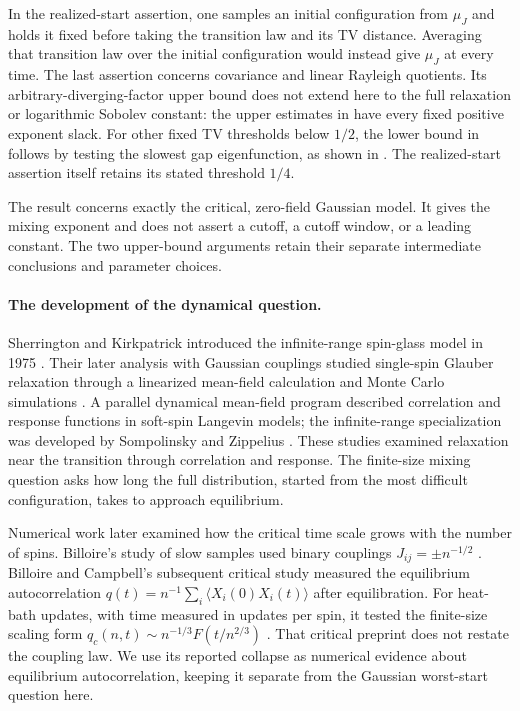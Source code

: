 In the realized-start assertion, one samples an initial configuration
from $\mu_J$ and holds it fixed before taking the transition law and its
TV distance. Averaging that transition law over the initial configuration
would instead give $\mu_J$ at every time. The last assertion concerns
covariance and linear Rayleigh quotients. Its arbitrary-diverging-factor
upper bound does not extend here to the full relaxation or logarithmic
Sobolev constant: the upper estimates in  have every
fixed positive exponent slack.
For other fixed TV thresholds below $1/2$, the lower bound in
 follows by testing the slowest gap eigenfunction, as
shown in . The realized-start assertion itself
retains its stated threshold $1/4$.

The result concerns exactly the critical, zero-field Gaussian model.
It gives the mixing exponent and does not assert a cutoff, a cutoff
window, or a leading constant. The two upper-bound arguments retain
their separate intermediate conclusions and parameter choices.

\paragraph{The development of the dynamical question.}
Sherrington and Kirkpatrick introduced the infinite-range spin-glass
model in 1975 \cite{SherringtonKirkpatrick1975}. Their later analysis
with Gaussian couplings studied single-spin Glauber relaxation through
a linearized mean-field calculation and Monte Carlo simulations
\cite[Section~VII]{KirkpatrickSherrington1978}. A parallel dynamical
mean-field program described correlation and response functions in
soft-spin Langevin models; the infinite-range specialization was
developed by Sompolinsky and Zippelius
\cite{SompolinskyZippelius1982}. These studies examined relaxation near
the transition through correlation and response. The finite-size mixing
question asks how long the full distribution, started from the most
difficult configuration, takes to approach equilibrium.

Numerical work later examined how the critical time scale grows with the
number of spins. Billoire's study of slow samples used binary couplings
$J_{ij}=\pm n^{-1/2}$ \cite{Billoire2011SlowSamples}. Billoire and
Campbell's subsequent critical study measured the equilibrium
autocorrelation
$q(t)=n^{-1}\sum_i\langle X_i(0)X_i(t)\rangle$ after equilibration.
For heat-bath updates, with time measured in updates per spin, it tested
the finite-size scaling form
$q_c(n,t)\sim n^{-1/3}F(t/n^{2/3})$
\cite[equation~(7)]{BilloireCampbell2011CriticalDynamics}.
That critical preprint does not restate the coupling law. We use its
reported collapse as numerical evidence about equilibrium autocorrelation,
keeping it separate from the Gaussian worst-start question here.

